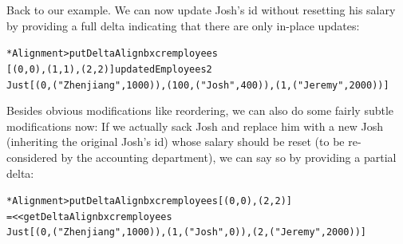 Back to our example. We can now update Josh's id without resetting his salary by providing a full delta indicating that there are only in-place updates:
\begin{alltt}
*Alignment> putDeltaAlign bx cr employees
     [(0,0), (1,1), (2,2)] updatedEmployees2
Just [(0,("Zhenjiang",1000)),(100,("Josh",400)),(1,("Jeremy",2000))]
\end{alltt}
Besides obvious modifications like reordering, we can also do some fairly subtle modifications now:
If we actually sack Josh and replace him with a new Josh (inheriting the original Josh's id) whose salary should be reset (to be re-considered by the accounting department), we can say so by providing a partial delta:
\begin{alltt}
*Alignment> putDeltaAlign bx cr employees [(0,0), (2,2)]
     =<< getDeltaAlign bx cr employees
Just [(0,("Zhenjiang",1000)),(1,("Josh",0)),(2,("Jeremy",2000))]
\end{alltt}

